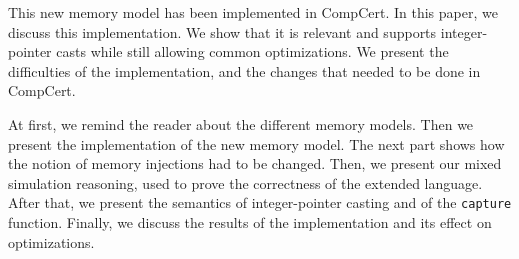This new memory model has been implemented in CompCert.
In this paper, we discuss this implementation.
We show that it is relevant and supports integer-pointer casts while still allowing common optimizations.
We present the difficulties of the implementation, and the changes that needed to be done in CompCert.

At first, we remind the reader about the different memory models.
Then we present the implementation of the new memory model. The next part shows how the notion of memory injections had to be changed. Then, we present our mixed simulation reasoning, used to prove the correctness of the extended language. After that, we present the semantics of integer-pointer casting and of the \texttt{capture} function.
Finally, we discuss the results of the implementation and its effect on optimizations. 
